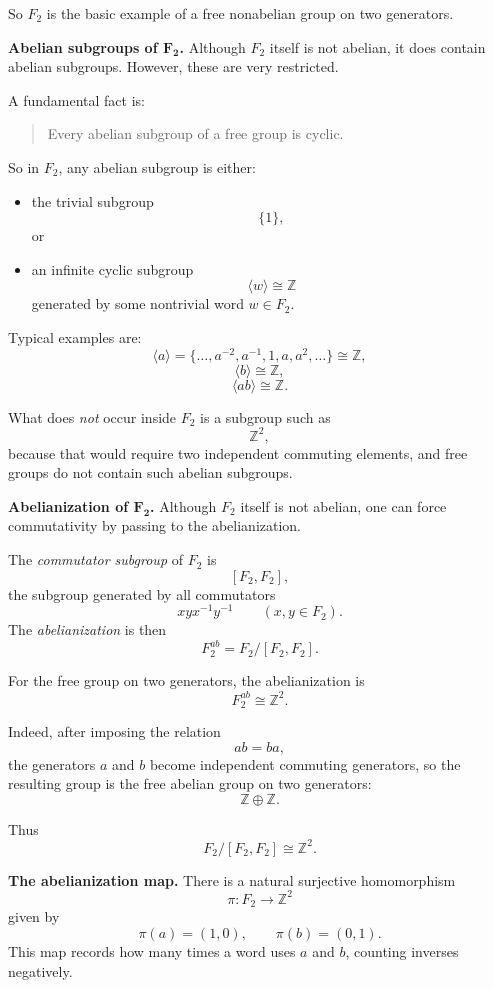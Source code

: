 \documentclass[12pt,a4paper]{article}
\theoremstyle{notespace}
\begin{document}
So \(F_2\) is the basic example of a free nonabelian group on two generators.

\bigskip

\textbf{Abelian subgroups of \(\boldsymbol{F_2}\).}
Although \(F_2\) itself is not abelian, it does contain abelian subgroups. However, these are very restricted.

A fundamental fact is:
\begin{quote}
	Every abelian subgroup of a free group is cyclic.
\end{quote}

So in \(F_2\), any abelian subgroup is either:
\begin{itemize}
	\item the trivial subgroup
	\[
	\{1\},
	\]
	or
	\item an infinite cyclic subgroup
	\[
	\langle w\rangle\cong \mathbb Z
	\]
	generated by some nontrivial word \(w\in F_2\).
\end{itemize}

Typical examples are:
\[
\langle a\rangle=\{\dots,a^{-2},a^{-1},1,a,a^2,\dots\}\cong \mathbb Z,
\]
\[
\langle b\rangle\cong \mathbb Z,
\]
\[
\langle ab\rangle\cong \mathbb Z.
\]

What does \emph{not} occur inside \(F_2\) is a subgroup such as
\[
\mathbb Z^2,
\]
because that would require two independent commuting elements, and free groups do not contain such abelian subgroups.

\bigskip

\textbf{Abelianization of \(\boldsymbol{F_2}\).}
Although \(F_2\) itself is not abelian, one can force commutativity by passing to the abelianization.

The \emph{commutator subgroup} of \(F_2\) is
\[
[F_2,F_2],
\]
the subgroup generated by all commutators
\[
xyx^{-1}y^{-1}
\qquad (x,y\in F_2).
\]
The \emph{abelianization} is then
\[
F_2^{ab}=F_2/[F_2,F_2].
\]

For the free group on two generators, the abelianization is
\[
F_2^{ab}\cong \mathbb Z^2.
\]

Indeed, after imposing the relation
\[
ab=ba,
\]
the generators \(a\) and \(b\) become independent commuting generators, so the resulting group is the free abelian group on two generators:
\[
\mathbb Z\oplus \mathbb Z.
\]

Thus
\[
F_2/[F_2,F_2]\cong \mathbb Z^2.
\]

\bigskip

\textbf{The abelianization map.}
There is a natural surjective homomorphism
\[
\pi:F_2\to \mathbb Z^2
\]
given by
\[
\pi(a)=(1,0),
\qquad
\pi(b)=(0,1).
\]
This map records how many times a word uses \(a\) and \(b\), counting inverses negatively.
\end{document}
